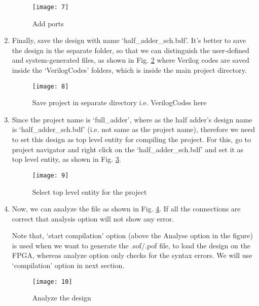 \begin{enumerate}
	\begin{figure}
		\centering
		\texttt{[image: 7]}
		\caption{Add ports}
		\label{fig:make_connections}
	\end{figure}
	
	\item Finally, save the design with name `half\_adder\_sch.bdf'. It's better to save the design in the separate folder, so that we can distinguish the user-defined and system-generated files, as shown in Fig. \ref{fig:save_project} where Verilog codes are saved inside the `VerilogCodes' folders, which is inside the main project directory. 
	
	\begin{figure}
		\centering
		\texttt{[image: 8]}
		\caption{Save project in separate directory i.e. VerilogCodes here}
		\label{fig:save_project}
	\end{figure}
	
	\item Since the project name is `full\_adder', where as the half adder's design name is `half\_adder\_sch.bdf' (i.e. not same as the project name), therefore we need to set this design as top level entity for compiling the project. For this, go to project navigator and right click on the `half\_adder\_sch.bdf' and set it as top level entity, as shown in Fig. \ref{fig:top_level_project}.  
	
	\begin{figure}
		\centering
		\texttt{[image: 9]}
		\caption{Select top level entity for the project}
		\label{fig:top_level_project}
	\end{figure}
	
	\item Now, we can analyze the file as shown in Fig. \ref{fig:analyze_design}. If all the connections are correct that analysis option will not show any error. 
	
	Note that, `start compilation' option (above the Analyse option in the figure) is used when we want to generate the .sof/.pof file, to load the design on the FPGA, whereas analyze option only checks for the syntax errors. We will use `compilation' option in next section. 
	
	\begin{figure}
		\centering
		\texttt{[image: 10]}
		\caption{Analyze the design}
		\label{fig:analyze_design}
	\end{figure}
	
\end{enumerate}

